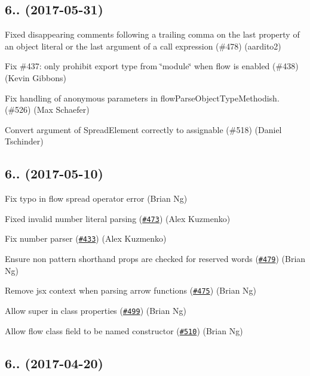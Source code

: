 \subsection*{6.. (2017-\/05-\/31)}


\begin{DoxyItemize}
\item Fixed disappearing comments following a trailing comma on the last property of an object literal or the last argument of a call expression (\#478) (aardito2)
\item Fix \#437\+: only prohibit \textquotesingle{}export type from \char`\"{}module\char`\"{} \textquotesingle{} when flow is enabled (\#438) (Kevin Gibbons)
\item Fix handling of anonymous parameters in {\ttfamily flow\+Parse\+Object\+Type\+Methodish}. (\#526) (Max Schaefer)
\item Convert argument of Spread\+Element correctly to assignable (\#518) (Daniel Tschinder)
\end{DoxyItemize}

\subsection*{6.. (2017-\/05-\/10)}


\begin{DoxyItemize}
\item Fix typo in flow spread operator error (Brian Ng)
\item Fixed invalid number literal parsing (\href{https://github.com/babel/babylon/pull/473}{\tt \#473}) (Alex Kuzmenko)
\item Fix number parser (\href{https://github.com/babel/babylon/pull/433}{\tt \#433}) (Alex Kuzmenko)
\item Ensure non pattern shorthand props are checked for reserved words (\href{https://github.com/babel/babylon/pull/479}{\tt \#479}) (Brian Ng)
\item Remove jsx context when parsing arrow functions (\href{https://github.com/babel/babylon/pull/475}{\tt \#475}) (Brian Ng)
\item Allow super in class properties (\href{https://github.com/babel/babylon/pull/499}{\tt \#499}) (Brian Ng)
\item Allow flow class field to be named constructor (\href{https://github.com/babel/babylon/pull/510}{\tt \#510}) (Brian Ng)
\end{DoxyItemize}

\subsection*{6.. (2017-\/04-\/20)}


